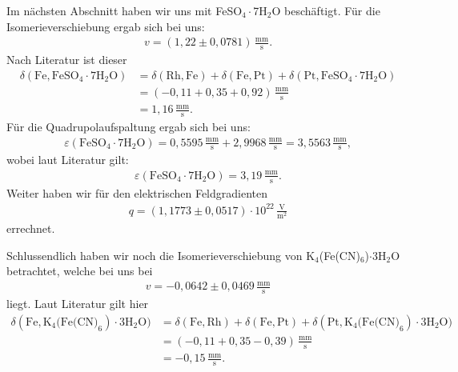 \documentclass[10pt,twoside]{article}
\renewcommand{\epsilon}{\varepsilon}
\renewcommand{\1}{^{-1}}
\renewcommand{\2}{^{-2}}
\newcommand{\3}{^{-3}}
\newcommand{\4}{^{-4}}
\newcommand{\5}{^{-5}}
\newcommand{\6}{^{-6}}
\newcommand{\7}{^{-7}}
\newcommand{\8}{^{-8}}
\newcommand{\9}{^{-9}}
\begin{document}
Im nächsten Abschnitt haben wir uns mit FeSO$_4\cdot$7H$_2$O beschäftigt. Für die Isomerieverschiebung ergab sich bei uns:
\begin{align*}
v=(1,22\pm 0,0781)\,\frac{\text{mm}}{\text{s}}.
\end{align*}
Nach Literatur ist dieser
\begin{align*}
\delta(\text{Fe},\text{FeSO}_4\cdot7\text{H}_2\text{O})&= \delta(\text{Rh},\text{Fe}) + \delta(\text{Fe},\text{Pt}) +\delta(\text{Pt},\text{FeSO}_4\cdot7\text{H}_2\text{O}) \\ &= (-0,11+0,35+0,92)\,\frac{\text{mm}}{\text{s}} \\ &= 1,16\,\frac{\text{mm}}{\text{s}}.
\end{align*}
Für die Quadrupolaufspaltung ergab sich bei uns:
\begin{align*}
\epsilon(\text{FeSO}_4\cdot7\text{H}_2\text{O})=0,5595\,\frac{\text{mm}}{\text{s}}+2,9968\,\frac{\text{mm}}{\text{s}}=3,5563\,\frac{\text{mm}}{\text{s}},
\end{align*}
wobei laut Literatur gilt:
\begin{align*}
\epsilon(\text{FeSO}_4\cdot7\text{H}_2\text{O})=3,19\,\frac{\text{mm}}{\text{s}}.
\end{align*}
Weiter haben wir für den elektrischen Feldgradienten 
\begin{align*}
q=(1,1773\pm 0,0517) \cdot 10^{22}\,\frac{\text{V}}{\text{m}^2}
\end{align*}
errechnet.\par 
Schlussendlich haben wir noch die Isomerieverschiebung von K$_4$(Fe(CN)$_6$)$\cdot$3H$_2$O betrachtet, welche bei uns bei 
\begin{align*}
v= -0,0642\pm0,0469\,\frac{\text{mm}}{\text{s}} 
\end{align*}
liegt. Laut Literatur gilt hier
\begin{align*}
\delta(\text{Fe},\text{K}_4\text{(Fe(CN)}_6)\cdot3\text{H}_2\text{O})&= \delta(\text{Fe},\text{Rh}) + \delta(\text{Fe},\text{Pt}) +\delta(\text{Pt},\text{K}_4\text{(Fe(CN)}_6)\cdot 3\text{H}_2\text{O}) \\ &= (-0,11+0,35-0,39)\,\frac{\text{mm}}{\text{s}} \\ &= -0,15\,\frac{\text{mm}}{\text{s}}.
\end{align*}
\end{document}
